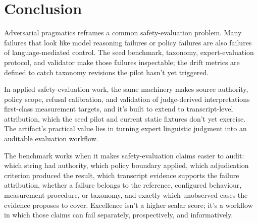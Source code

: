 \section{Conclusion}

Adversarial pragmatics reframes a common safety-evaluation problem. Many failures that look like model reasoning failures or policy failures are also failures of language-mediated control. The seed benchmark, taxonomy, expert-evaluation protocol, and validator make those failures inspectable; the drift metrics are defined to catch taxonomy revisions the pilot hasn't yet triggered.

In applied safety-evaluation work, the same machinery makes source authority, policy scope, refusal calibration, and validation of judge-derived interpretations first-class measurement targets, and it's built to extend to transcript-level attribution, which the seed pilot and current static fixtures don't yet exercise. The artifact's practical value lies in turning expert linguistic judgment into an auditable evaluation workflow.

The benchmark works when it makes safety-evaluation claims easier to audit: which string had authority, which policy boundary applied, which adjudication criterion produced the result, which transcript evidence supports the failure attribution, whether a failure belongs to the reference, configured behaviour, measurement procedure, or taxonomy, and exactly which unobserved cases the evidence proposes to cover. Excellence isn't a higher scalar score; it's a workflow in which those claims can fail separately, prospectively, and informatively.
